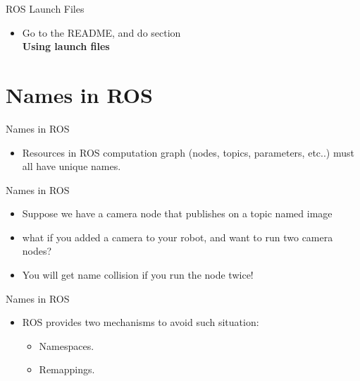 \documentclass{beamer}
\begin{document}
\begin{frame}{ROS Launch Files}
    \begin{itemize}
        \centering
        \item Go to the README, and do section  \\   \textbf{Using launch files}
    \end{itemize}  
\end{frame}

\section{Names in ROS}
\begin{frame}{Names in ROS}
    \begin{itemize}
        \item Resources in ROS computation graph (nodes, topics, parameters, etc..) must all have unique names.

    \end{itemize}  
\end{frame}


\begin{frame}{Names in ROS}
    \begin{itemize}
        \item Suppose we have a {\ttfamily \colorbox{gray!30!white}{camera}} node that publishes on a topic named {\ttfamily \colorbox{gray!30!white}{image}}
        
        \item what if you added a camera to your robot, and want to run two {\ttfamily \colorbox{gray!30!white}{camera}} nodes?
        
        \item You will get name collision if you run the node twice!
    \end{itemize}  
\end{frame}


\begin{frame}{Names in ROS}
    \begin{itemize}
        
        
        \item ROS provides two mechanisms to avoid such situation:
        \begin{itemize}
            \item Namespaces.
            \item Remappings.
        \end{itemize}
    \end{itemize}  
\end{frame}
\end{document}
